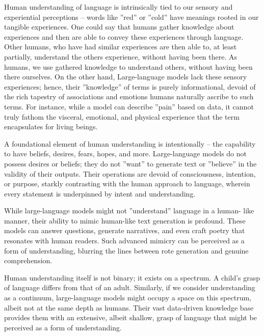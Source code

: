 \documentclass{article}
\begin{document}
Human understanding of language is intrinsically tied to our sensory and experiential perceptions – words like ”red” or ”cold” have meanings rooted in our
tangible experiences. One could say that humans gather knowledge about experiences and then are able to convey these experiences through language. Other humans, who have had similar experiences are then able to, at least partially, understand the others experience, without having been there. As humans, we use gathered knowledge to understand others, without having been there ourselves. On the other hand, Large-language models lack these sensory experiences; hence, their ”knowledge” of terms is purely informational, devoid of the rich
tapestry of associations and emotions humans naturally ascribe to such terms.
For instance, while a model can describe ”pain” based on data, it cannot truly
fathom the visceral, emotional, and physical experience that the term encapsulates for living beings.
\cite{barsalou2008grounded}

A foundational element of human understanding is intentionally – the capability to have beliefs, desires, fears, hopes, and more. Large-language models do
not possess desires or beliefs; they do not ”want” to generate text or ”believe”
in the validity of their outputs. Their operations are devoid of consciousness,
intention, or purpose, starkly contrasting with the human approach to language,
wherein every statement is underpinned by intent and understanding.
\cite{searle1980minds}

While large-language models might not ”understand” language in a human-
like manner, their ability to mimic human-like text generation is profound.
These models can answer questions, generate narratives, and even craft poetry
that resonates with human readers. Such advanced mimicry can be perceived as
a form of understanding, blurring the lines between rote generation and genuine
comprehension.
\cite{radford2019language}
    
Human understanding itself is not binary; it exists on a spectrum. A child’s
grasp of language differs from that of an adult. Similarly, if we consider understanding as a continuum, large-language models might occupy a space on
this spectrum, albeit not at the same depth as humans. Their vast data-driven
knowledge base provides them with an extensive, albeit shallow, grasp of language that might be perceived as a form of understanding.
\cite{chomsky1968language}
\end{document}
